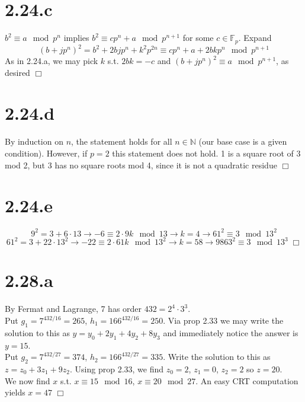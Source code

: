 \documentclass{article}
\begin{document}
\section*{2.24.c}
$b^2 \equiv a \mod p^n$ implies $b^2 \equiv cp^n + a \mod p^{n+1}$ for some $c \in \mathbb{F}_p$. Expand
$$(b+jp^n)^2 = b^2 + 2bjp^n + k^2p^{2n} \equiv cp^n + a + 2bkp^n \mod p^{n+1}$$
As in 2.24.a, we may pick $k$ s.t. $2bk = -c$ and $(b+jp^n)^2 \equiv a \mod p^{n+1}$, as desired $\Box$

\section*{2.24.d}
By induction on $n$, the statement holds for all $n \in \mathbb{N}$ (our base case is a given condition). However, if $p = 2$ this statement does not hold. 1 is a square root of 3 mod 2, but 3 has no square roots mod 4, since it is not a quadratic residue $\Box$

\section*{2.24.e}
$$9^2 = 3 + 6 \cdot 13 \to -6 \equiv 2\cdot9k \mod 13 \to k = 4 \to 61^2 \equiv 3 \mod 13^2$$
$$61^2 = 3 + 22 \cdot 13^2 \to -22 \equiv 2\cdot61k \mod 13^2 \to k = 58 \to 9863^2 \equiv 3 \mod 13^3 \; \Box$$



\section*{2.28.a}
By Fermat and Lagrange, 7 has order $432 = 2^4\cdot 3^3$.\\
Put $g_1 = 7^{432/16} = 265$, $h_1 = 166^{432/16} = 250$. Via prop 2.33 we may write the solution to this as $y = y_0 + 2y_1 + 4y_2 + 8y_3$ and immediately notice the answer is $y = 15$.\\
Put $g_2 = 7^{432/27} = 374$, $h_2 = 166^{432/27} = 335$. Write the solution to this as $z = z_0 + 3z_1 + 9z_2$. Using prop 2.33, we find $z_0 = 2$, $z_1 = 0$, $z_2 = 2$ so $z = 20$.\\
We now find $x$ s.t. $x \equiv 15 \mod 16$, $x \equiv 20 \mod 27$. An easy CRT computation yields $x = 47$ $\Box$
\end{document}

